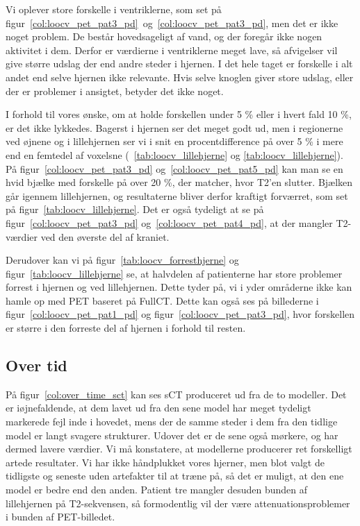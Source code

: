 Vi oplever store forskelle i ventriklerne, som set på figur~\ref{col:loocv_pet_pat3_pd}~og~\ref{col:loocv_pet_pat3_pd},  men det er ikke noget problem. De består hovedsageligt af vand, og der foregår ikke nogen aktivitet i dem. Derfor er værdierne i ventriklerne meget lave, så afvigelser vil give større udslag der end andre steder i hjernen. I det hele taget er forskelle i alt andet end selve hjernen ikke relevante. Hvis selve knoglen giver store udslag, eller der er problemer i ansigtet, betyder det ikke noget.


I forhold til vores ønske, om at holde forskellen under 5 \% eller i hvert fald 10 \%,  er det ikke lykkedes. Bagerst i hjernen ser det meget godt ud, men i regionerne ved øjnene og i lillehjernen ser vi i snit en procentdifference på over 5 \% i mere end en femtedel af voxelsne (~\ref{tab:loocv_lillehjerne} og \ref{tab:loocv_lillehjerne}). På figur~\ref{col:loocv_pet_pat3_pd} og~\ref{col:loocv_pet_pat5_pd}  kan man se en hvid bjælke med forskelle på over 20 \%, der matcher, hvor T2’en slutter. Bjælken går igennem lillehjernen, og resultaterne bliver derfor kraftigt forværret, som set på figur~\ref{tab:loocv_lillehjerne}. Det er også tydeligt at se på figur~\ref{col:loocv_pet_pat3_pd} og~\ref{col:loocv_pet_pat4_pd}, at der mangler T2-værdier ved den øverste del af kraniet.


Derudover kan vi på figur~\ref{tab:loocv_forresthjerne} og figur~\ref{tab:loocv_lillehjerne} se, at halvdelen af patienterne har store problemer forrest i hjernen og ved lillehjernen. Dette tyder på, vi i yder områderne ikke kan hamle op med PET baseret på FullCT. Dette kan også ses på billederne i figur~\ref{col:loocv_pet_pat1_pd} og figur~\ref{col:loocv_pet_pat3_pd}, hvor forskellen er større i den forreste del af hjernen i forhold til resten.

\subsection{Over tid}

På figur~\ref{col:over_time_sct} kan ses sCT produceret ud fra
de to modeller. Det er iøjnefaldende, at dem lavet ud fra den sene model
har meget tydeligt markerede fejl inde i hovedet, mens der de samme
steder i dem fra den tidlige model er langt svagere strukturer. Udover
det er de sene også mørkere, og har dermed lavere værdier. Vi må
konstatere, at modellerne producerer ret forskelligt artede resultater.
Vi har ikke håndplukket vores hjerner, men blot valgt de tidligste
og seneste uden artefakter til at træne på, så det er muligt, at
den ene model er bedre end den anden. Patient tre mangler desuden
bunden af lillehjernen på T2-sekvensen, så formodentlig vil der være
attenuationsproblemer i bunden af PET-billedet.

